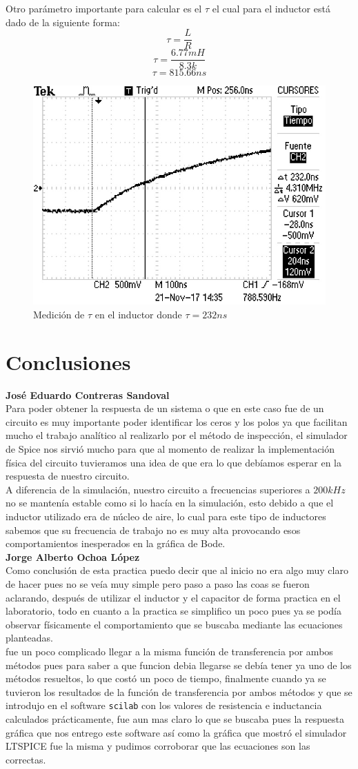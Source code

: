 \documentclass[letterpaper,10pt]{article}
\begin{document}
\FloatBarrier
Otro parámetro importante para calcular es el $\tau$ el cual para el inductor está dado de la siguiente forma:
\[\tau =\frac{L}{R}\]
\[\tau =\frac{6.77mH}{8.3k}\]
\[\tau =815.66ns\]
\begin{figure}[h!]
	\centering
	\includegraphics[width=0.5\linewidth]{foto2}
	\caption{Medición de $\tau$ en el inductor donde $\tau=232ns$}
	\label{fig:foto2}
\end{figure}
\FloatBarrier
\section{Conclusiones}
\textbf{José Eduardo Contreras Sandoval}\\
Para poder obtener la respuesta de un sistema o que en este caso fue de un circuito es muy importante poder identificar los ceros y los polos ya que facilitan mucho el trabajo analítico al realizarlo por el método de inspección, el simulador de Spice nos sirvió mucho para que al momento de realizar la implementación física del circuito tuvieramos una idea de que era lo que debíamos esperar en la respuesta de nuestro circuito.\\

A diferencia de la simulación, nuestro circuito a frecuencias superiores a $200kHz$ no se mantenía estable como si lo hacía en la simulación, esto debido a que el inductor utilizado era de núcleo de aire, lo cual para este tipo de inductores sabemos que su frecuencia de trabajo no es muy alta provocando esos comportamientos inesperados en la gráfica de Bode.\\

\textbf{Jorge Alberto Ochoa López}\\
Como conclusión de esta practica puedo decir que al inicio no era algo muy claro de hacer pues 
no se veía muy simple pero paso a paso las coas se fueron aclarando, después de utilizar el inductor y el capacitor de forma practica en el laboratorio,
todo en cuanto a la practica se simplifico un poco pues ya se podía observar físicamente el comportamiento
que se buscaba mediante las ecuaciones planteadas. \\
fue un poco complicado llegar a la misma función de transferencia por ambos métodos pues para saber a que funcion debia llegarse se debía tener ya uno
de los métodos resueltos, lo que costó un poco de tiempo, finalmente cuando ya se tuvieron los resultados de la función de transferencia por ambos métodos y que se introdujo 
en el software \texttt{scilab} con los valores de resistencia e inductancia calculados prácticamente, fue aun mas claro lo que se buscaba pues la respuesta gráfica que nos entrego este software así como 
la gráfica que mostró el simulador LTSPICE fue la misma y pudimos corroborar que las ecuaciones son las correctas.
\end{document}
